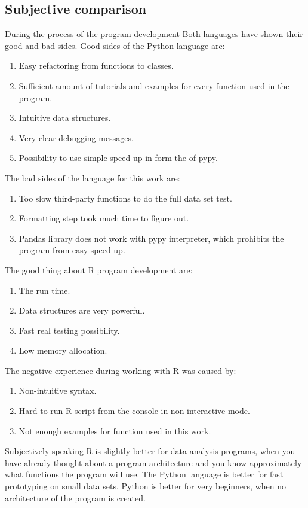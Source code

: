 \documentclass[
  twoside,
  12pt, a4paper,
  footinclude=true,
  headinclude=true,
  cleardoublepage=empty
]{article}
\begin{document}
\subsection{Subjective comparison}
During the process of the program development Both languages have shown their good and bad sides. Good sides of the Python language are:
\begin{enumerate}
    \item Easy refactoring from functions to classes.
    \item Sufficient amount of tutorials and examples for every function used in the program.
    \item Intuitive data structures.
    \item Very clear debugging messages.
    \item Possibility to use simple speed up in form the of pypy.
\end{enumerate}
The bad sides of the language for this work are:
\begin{enumerate}
    \item Too slow third-party functions to do the full data set test.
    \item Formatting step took much time to figure out.
    \item Pandas library does not work with pypy interpreter, which prohibits the program from easy speed up.
\end{enumerate} 
The good thing about R program development are:
\begin{enumerate}
    \item The run time.
    \item Data structures are very powerful.
    \item Fast real testing possibility.
    \item Low memory allocation.
\end{enumerate}
The negative experience during working with R was caused by:
\begin{enumerate}
    \item Non-intuitive syntax.
    \item Hard to run R script from the console in non-interactive mode.
    \item Not enough examples for function used in this work.
\end{enumerate} 
Subjectively speaking R is slightly better for data analysis programs, when you have already thought about a program architecture and you know approximately what functions the program will use. The Python language is better for fast prototyping on small data sets. Python is better for very beginners, when no architecture of the program is created.
  
\end{document}
